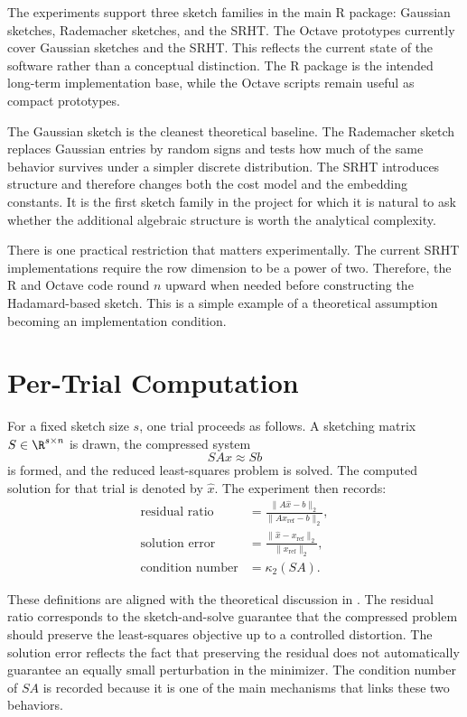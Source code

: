 The experiments support three sketch families in the main R package:
Gaussian sketches, Rademacher sketches, and the SRHT. The Octave prototypes
currently cover Gaussian sketches and the SRHT. This reflects the current state of
the software rather than a conceptual distinction. The R package is the intended
long-term implementation base, while the Octave scripts remain useful as compact
prototypes.

The Gaussian sketch is the cleanest theoretical baseline. The Rademacher sketch
replaces Gaussian entries by random signs and tests how much of the same
behavior survives under a simpler discrete distribution. The SRHT introduces
structure and therefore changes both the cost model and the embedding constants.
It is the first sketch family in the project for which it is natural to ask whether
the additional algebraic structure is worth the analytical complexity.

There is one practical restriction that matters experimentally. The current SRHT
implementations require the row dimension to be a power of two. Therefore, the R
and Octave code round \(n\) upward when needed before constructing the
Hadamard-based sketch. This is a simple example of a theoretical assumption
becoming an implementation condition.

\section{Per-Trial Computation}

For a fixed sketch size \(s\), one trial proceeds as follows. A sketching matrix
\(S \in \R^{s \times n}\) is drawn, the compressed system
\[
	SAx \approx Sb
\]
is formed, and the reduced least-squares problem is solved. The computed solution for that trial is denoted by \(\hat x\). The experiment then records:
\begin{align*}
	\text{residual ratio}   & = \frac{\|A\hat x - b\|_2}{\|A x_{\mathrm{ref}} - b\|_2},         \\
	\text{solution error}   & = \frac{\|\hat x - x_{\mathrm{ref}}\|_2}{\|x_{\mathrm{ref}}\|_2}, \\
	\text{condition number} & = \kappa_2(SA).
\end{align*}

These definitions are aligned with the theoretical discussion in .
The residual ratio corresponds to the sketch-and-solve guarantee that the
compressed problem should preserve the least-squares objective up to a controlled
distortion. The solution error reflects the fact that preserving the residual does
not automatically guarantee an equally small perturbation in the minimizer. The
condition number of \(SA\) is recorded because it is one of the main mechanisms
that links these two behaviors.

